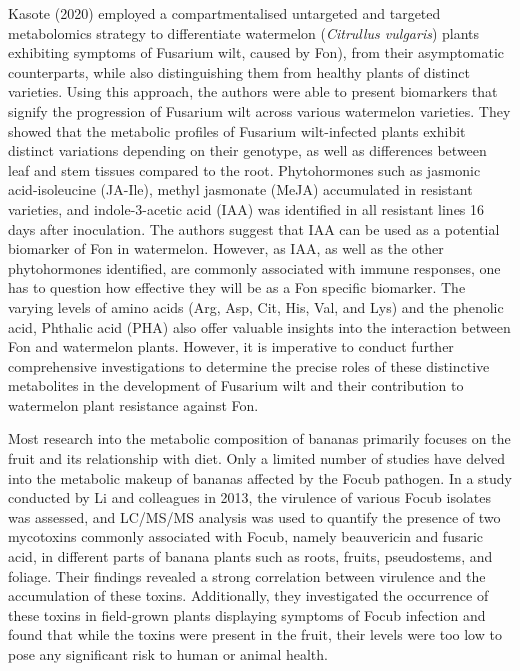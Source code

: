 Kasote \et (2020) employed a compartmentalised untargeted and targeted metabolomics strategy to differentiate watermelon (\textit{Citrullus vulgaris}) plants exhibiting symptoms of Fusarium wilt, caused by \ac{Fon}), from their asymptomatic counterparts, while also distinguishing them from healthy plants of distinct varieties. Using this approach, the authors were able to present biomarkers that signify the progression of Fusarium wilt across various watermelon varieties. They showed that the metabolic profiles of Fusarium wilt-infected plants exhibit distinct variations depending on their genotype, as well as differences between leaf and stem tissues compared to the root. Phytohormones such as jasmonic acid-isoleucine (JA-Ile), methyl jasmonate (MeJA) accumulated in resistant varieties, and indole-3-acetic acid (IAA) was identified in all resistant lines 16 days after inoculation. The authors suggest that IAA can be used as a potential biomarker of \ac{Fon} in watermelon. However, as IAA, as well as the other phytohormones identified,  are commonly associated with immune responses, one has to question how effective they will be as a \ac{Fon} specific biomarker. The varying levels of amino acids (Arg, Asp, Cit, His, Val, and Lys) and the phenolic acid, Phthalic acid (PHA) also offer valuable insights into the interaction between \ac{Fon} and watermelon plants. However, it is imperative to conduct further comprehensive investigations to determine the precise roles of these distinctive metabolites in the development of Fusarium wilt and their contribution to watermelon plant resistance against \ac{Fon}.

Most research into the metabolic composition of bananas primarily focuses on the fruit and its relationship with diet. Only a limited number of studies have delved into the metabolic makeup of bananas affected by the \ac{Focub} pathogen. In a study conducted by Li and colleagues in 2013, the virulence of various \ac{Focub} isolates was assessed, and LC/MS/MS analysis was used to quantify the presence of two mycotoxins commonly associated with \ac{Focub}, namely beauvericin and fusaric acid, in different parts of banana plants such as roots, fruits, pseudostems, and foliage. Their findings revealed a strong correlation between virulence and the accumulation of these toxins. Additionally, they investigated the occurrence of these toxins in field-grown plants displaying symptoms of \ac{Focub} infection and found that while the toxins were present in the fruit, their levels were too low to pose any significant risk to human or animal health.

